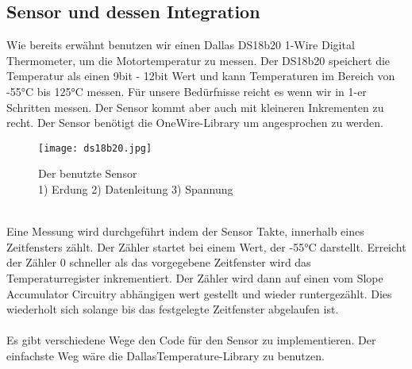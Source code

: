 \documentclass{article}
\begin{document}
\subsection{Sensor und dessen Integration}
Wie bereits erwähnt benutzen wir einen Dallas DS18b20  1-Wire Digital Thermometer, um die Motortemperatur zu messen. Der DS18b20 speichert die Temperatur als einen 9bit - 12bit Wert und kann Temperaturen im Bereich von -55°C bis 125°C messen. Für unsere Bedürfnisse reicht es wenn wir in 1-er Schritten messen. Der Sensor kommt aber auch mit kleineren Inkrementen zu recht. Der Sensor benötigt die OneWire-Library um angesprochen zu werden.\\
\begin{figure}[h]
	\texttt{[image: ds18b20.jpg]}
	\centering
	\caption{Der benutzte Sensor \\1) Erdung 2) Datenleitung 3) Spannung}
\end{figure}
\\
Eine Messung wird durchgeführt indem der Sensor Takte, innerhalb eines Zeitfensters zählt. Der Zähler startet bei einem Wert, der -55°C darstellt. Erreicht der Zähler 0 schneller als das vorgegebene Zeitfenster wird das Temperaturregister inkrementiert. Der Zähler wird dann auf einen vom Slope Accumulator Circuitry abhängigen wert gestellt und wieder runtergezählt. Dies wiederholt sich solange bis das festgelegte Zeitfenster abgelaufen ist. \\
\\
Es gibt verschiedene Wege den Code für den Sensor zu implementieren. Der einfachste Weg wäre die DallasTemperature-Library zu benutzen.
\end{document}
